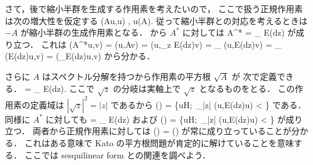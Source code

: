 さて，後で縮小半群を生成する作用素を考えたいので，
ここで扱う正規作用素は次の増大性を仮定する
\bdn %
\Re (Au,u)
, \quad \forall u\in \Dom(A).
\edn %
従って縮小半群との対応を考えるときは $-A$ が縮小半群の生成作用素となる．
 から $A^*$ に対しては
\bdn %
A^*
= \int_\C {} E(dz)
\edn %
が成り立つ．
これは
\bdm %
(A^*u,v)
= (u,Av)
= (u,\int_\C z E(dz)v)
= \int_\C {} (u,E(dz)v)
= \int_\C {} (E(dz)u,v)
= (\int_\C {}E(dz)u,v)
\edm %
から分かる．


さらに $A$ はスペクトル分解を持つから作用素の平方根 $\sqrt{A}$ が
次で定義できる．
\bdn %
= \int_\C {} E(dz).
\edn %
ここで $\sqrt{z}$ の分岐は実軸上で $\sqrt{z}$ となるものをとる．
この作用素の定義域は $|\sqrt{z}|^2 = |z|$ であるから
\bdn %
\Dom()
= \{u\in H;\, \int_\C |z| (u,E(dz)u) < \infty \}
\edn %
である． 
同様に $A^*$ に対しても
\bdn %
= \int_\C {} E(dz)
\edn %
および
\bdn %
\Dom()
= \{u\in H;\, \int_\C |z| (u,E(dz)u) < \infty \}
\edn %
が成り立つ．
両者から正規作用素に対しては 
\bdn %
\Dom()
= \Dom()
\edn %
が常に成り立っていることが分かる．
これはある意味で Kato の平方根問題が肯定的に解けていることを意味する．
ここでは sesquilinear form との関連を調べよう．

